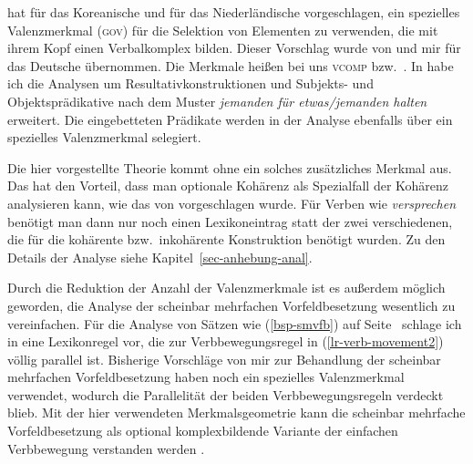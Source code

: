 \citet*{Chung93a} hat für das Koreanische
und \citet*{Rentier94} für das Niederländische vorgeschlagen,
ein spezielles Valenzmerkmal (\textsc{gov}) für die Selektion von Elementen zu verwenden,
die mit ihrem Kopf einen Verbalkomplex bilden. Dieser Vorschlag wurde
von \citet{Kathol98b,Kathol2000a} und mir \citep{Mueller97c,Mueller99a} für das Deutsche übernommen.
Die Merkmale heißen bei uns \textsc{vcomp} bzw.\ \xcomp.
In  habe ich die Analysen um Resultativkonstruktionen und Subjekts- und
Objektsprädikative nach dem Muster \emph{jemanden für etwas/jemanden halten} erweitert.
Die eingebetteten Prädikate werden in der Analyse ebenfalls über ein spezielles Valenzmerkmal selegiert.

Die hier vorgestellte Theorie kommt ohne ein solches zusätzliches Merkmal aus.
Das hat den Vorteil, dass man optionale Kohärenz als Spezialfall der Kohärenz analysieren
kann, wie das von \citet[178]{Kiss95a} vorgeschlagen wurde. Für Verben wie \emph{versprechen}
benötigt man dann nur noch einen Lexikoneintrag statt der zwei verschiedenen, die für
die kohärente bzw.\ inkohärente Konstruktion benötigt wurden. Zu den Details der Analyse siehe
Kapitel~\ref{sec-anhebung-anal}.

Durch die Reduktion der Anzahl der Valenzmerkmale ist es außerdem möglich geworden,
die Analyse der scheinbar mehrfachen Vorfeldbesetzung wesentlich zu vereinfachen.
Für die Analyse von Sätzen wie (\ref{bsp-smvfb}) auf Seite~\pageref{bsp-smvfb} schlage ich in
eine Lexikonregel vor, die zur Verbbewegungsregel in (\ref{lr-verb-movement2})
völlig parallel ist. Bisherige Vorschläge von mir zur Behandlung der 
scheinbar mehrfachen Vorfeldbesetzung \citep{Mueller2002f,Mueller2002c} haben
noch ein spezielles Valenzmerkmal verwendet, wodurch die Parallelität der beiden
Verbbewegungsregeln verdeckt blieb. Mit der hier verwendeten Merkmalsgeometrie kann
die scheinbar mehrfache Vorfeldbesetzung als optional komplexbildende Variante
der einfachen Verbbewegung verstanden werden \citep[321]{Mueller2005d}.




